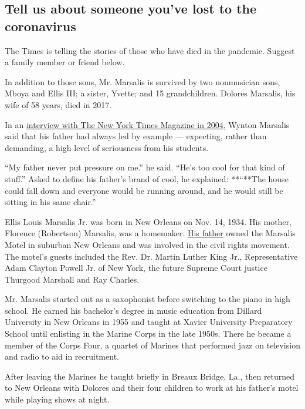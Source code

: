 \hypertarget{tell-us-about-someone-youve-lost-to-the-coronavirus}{%
\subsection{Tell us about someone you've lost to the
coronavirus}\label{tell-us-about-someone-youve-lost-to-the-coronavirus}}

The Times is telling the stories of those who have died in the pandemic.
Suggest a family member or friend below.

In addition to those sons, Mr. Marsalis is survived by two nonmusician
sons, Mboya and Ellis III; a sister, Yvette; and 15 grandchildren.
Dolores Marsalis, his wife of 58 years, died in 2017.

In an
\href{https://www.nytimes.com/2004/10/03/magazine/the-music-man.html}{interview
with The New York Times Magazine in 2004}, Wynton Marsalis said that his
father had always led by example --- expecting, rather than demanding, a
high level of seriousness from his students.

``My father never put pressure on me.'' he said. ``He's too cool for
that kind of stuff.'' Asked to define his father's brand of cool, he
explained: **``**The house could fall down and everyone would be running
around, and he would still be sitting in his same chair.''

Ellis Louis Marsalis Jr. was born in New Orleans on Nov. 14, 1934. His
mother, Florence (Robertson) Marsalis, was a homemaker.
\href{https://www.nytimes.com/2004/09/24/arts/music/ellis-marsalis-sr-96-jazzmens-patriarch-dies.html}{His
father} owned the Marsalis Motel in suburban New Orleans and was
involved in the civil rights movement. The motel's guests included the
Rev. Dr. Martin Luther King Jr., Representative Adam Clayton Powell Jr.
of New York, the future Supreme Court justice Thurgood Marshall and Ray
Charles.

Mr. Marsalis started out as a saxophonist before switching to the piano
in high school. He earned his bachelor's degree in music education from
Dillard University in New Orleans in 1955 and taught at Xavier
University Preparatory School until enlisting in the Marine Corps in the
late 1950s. There he became a member of the Corps Four, a quartet of
Marines that performed jazz on television and radio to aid in
recruitment.

After leaving the Marines he taught briefly in Breaux Bridge, La., then
returned to New Orleans with Dolores and their four children to work at
his father's motel while playing shows at night.

